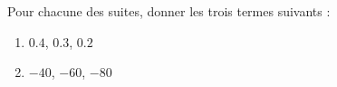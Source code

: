 
\begin{exercice}\label{exo2smath-0075}

    Pour chacune des suites, donner les trois termes suivants :
    \begin{enumerate}
        \item
            \( 0.4\), \( 0.3\), \( 0.2\)
        \item
            \( -40\), \( -60\), \( -80\)
    \end{enumerate}


\end{exercice}
